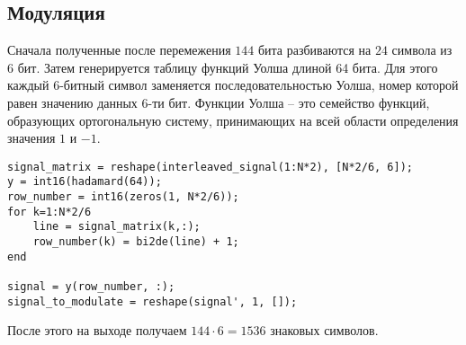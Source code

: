 \documentclass[a4paper]{article}
\begin{document}
\subsection{Модуляция}
Сначала полученные после перемежения $144$ бита разбиваются на $24$ символа из $6$ бит. Затем генерируется таблицу
функций Уолша длиной 64 бита. Для этого каждый 6-битный символ заменяется последовательностью Уолша, номер которой
равен значению данных 6-ти бит.
Функции Уолша -- это семейство функций, образующих ортогональную систему, принимающих на всей области определения
значения $1$ и $-1$.
\begin{lstlisting}
signal_matrix = reshape(interleaved_signal(1:N*2), [N*2/6, 6]);
y = int16(hadamard(64));
row_number = int16(zeros(1, N*2/6));
for k=1:N*2/6
    line = signal_matrix(k,:);
    row_number(k) = bi2de(line) + 1;
end

signal = y(row_number, :);
signal_to_modulate = reshape(signal', 1, []);
\end{lstlisting}
После этого на выходе получаем $144\cdot 6=1536$ знаковых символов.
\end{document}
